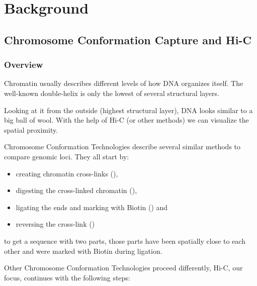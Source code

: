 \chapter{Background}\label{chap:background}
% 
% 

\section{Chromosome Conformation Capture and Hi-C}\label{sec:c3}\label{sec:hic}



\subsection{Overview}


Chromatin usually describes different levels of how DNA organizes itself. The
well-known double-helix is only the lowest of several structural layers.

Looking at it from the outside (highest structural layer), DNA looks similar to
a big ball of wool. With the help of Hi-C (or other methods) we can visualize
the spatial proximity.




Chromosome Conformation Technologies describe several similar methods to
compare genomic loci. They all start by:

\begin{itemize}
    \item creating chromatin cross-links (),
    \item digesting the cross-linked chromatin (),
    \item ligating the ends and marking with Biotin () and
    \item reversing the cross-link ()
\end{itemize}

to get a sequence with two parts, those parts have been spatially close
to each other and were marked with Biotin during ligation.

Other Chromosome Conformation Technologies proceed differently, Hi-C, our
focus, continues with the following steps:

